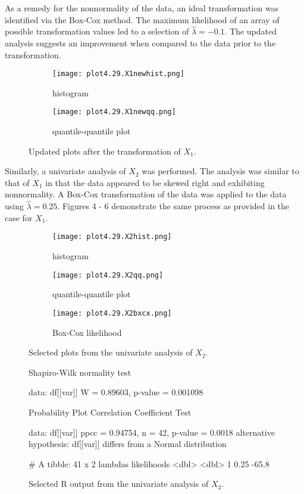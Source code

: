 As a remedy for the nonnormality of the data, an ideal transformation was identified via the Box-Cox method. The maximum likelihood of an array of possible transformation values led to a selection of $\hat{\lambda} = -0.1$. The updated analysis suggests an improvement when compared to the data prior to the transformation.
\begin{figure}[H]
\begin{subfigure}{.5\textwidth}
  \centering
  \texttt{[image: plot4.29.X1newhist.png]}
  \caption{histogram}
  \label{fig:sfig1}
\end{subfigure}%
\begin{subfigure}{.5\textwidth}
  \centering
  \texttt{[image: plot4.29.X1newqq.png]}
  \caption{quantile-quantile plot}
  \label{fig:sfig2}
\end{subfigure}
\caption{Updated plots after the transformation of $X_1$.}
\end{figure}
Similarly, a univariate analysis of $X_2$ was performed. The analysis was similar to that of $X_1$ in that the data appeared to be skewed right and exhibiting nonnormality. A Box-Cox transformation of the data was applied to the data using $\hat{\lambda} = 0.25$. Figures 4 - 6 demonstrate the same process as provided in the case for $X_1$.
\begin{figure}[H]
\begin{subfigure}{.33\textwidth}
  \centering
  \texttt{[image: plot4.29.X2hist.png]}
  \caption{histogram}
  \label{fig:sfig1}
\end{subfigure}%
\begin{subfigure}{.33\textwidth}
  \centering
  \texttt{[image: plot4.29.X2qq.png]}
  \caption{quantile-quantile plot}
  \label{fig:sfig2}
\end{subfigure}
\begin{subfigure}{.33\textwidth}
  \centering
  \texttt{[image: plot4.29.X2bxcx.png]}
  \caption{Box-Cox likelihood}
  \label{fig:sfig3}
\end{subfigure}%
\caption{Selected plots from the univariate analysis of $X_2$.} 
\end{figure}
\begin{figure}[H]
\begin{rc}
	Shapiro-Wilk normality test

data:  df[[var]]
W = 0.89603, p-value = 0.001098


	Probability Plot Correlation Coefficient Test

data:  df[[var]]
ppcc = 0.94754, n = 42, p-value = 0.0018
alternative hypothesis: df[[var]] differs from a Normal distribution

# A tibble: 41 x 2
  lambdas likelihoods
    <dbl>       <dbl>
1    0.25       -65.8
\end{rc}
\caption{Selected R output from the univariate analysis of $X_2$.}
\end{figure}
